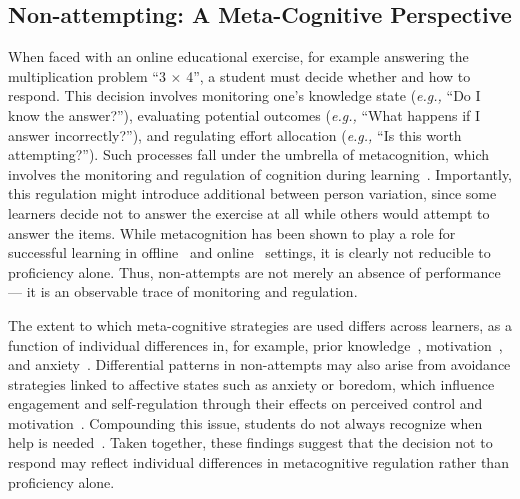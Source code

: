 \documentclass[11pt]{article}
\begin{document}
\subsection{Non-attempting: A Meta-Cognitive Perspective} %
When faced with an online educational exercise, for example answering the multiplication problem ``3 $\times$ 4'', a student must decide whether and how to respond. This decision involves monitoring one's knowledge state (\textit{e.g.,} ``Do I know the answer?''), evaluating potential outcomes (\textit{e.g.,} ``What happens if I answer incorrectly?''), and regulating effort allocation (\textit{e.g.,} ``Is this worth attempting?''). Such processes fall under the umbrella of metacognition, which involves the monitoring and regulation of cognition during learning~\parencite{winne2017cognition}. Importantly, this regulation might introduce additional between person variation, since some learners decide not to answer the exercise at all while others would attempt to answer the items. While metacognition has been shown to play a role for successful learning in offline~\parencite{rabinowitz2017nteraction, fleur2021metacognition, colantonio2024predicting} and online~\parencite{zhao2020time, kim2009not, fidan2024emotions, shields2024active} settings, it is clearly not reducible to proficiency alone. Thus, non-attempts are not merely an absence of performance --- it is an observable trace of monitoring and regulation. 

The extent to which meta-cognitive strategies are used differs across learners, as a function of individual differences in, for example, prior knowledge~\parencite{taub2014can}, motivation~\parencite{sungur2007modeling, karlen2016differences}, and anxiety~\parencite{matthews1999metacognition, wells1995metacognition}. Differential patterns in non-attempts may also arise from avoidance strategies linked to affective states such as anxiety or boredom, which influence engagement and self-regulation through their effects on perceived control and motivation~\parencite{pekrun2013control}. Compounding this issue, students do not always recognize when help is needed~\parencite{aleven2000limitations}. Taken together, these findings suggest that the decision not to respond may reflect individual differences in metacognitive regulation rather than proficiency alone. %
\end{document}
